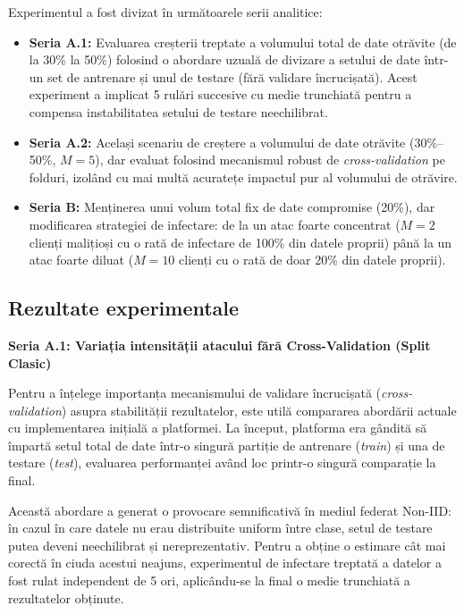 \documentclass[../../main.tex]{subfiles}
\begin{document}
        Experimentul a fost divizat în următoarele serii analitice:
        \begin{itemize}
            \item \textbf{Seria A.1:} Evaluarea creșterii treptate a volumului total de date otrăvite (de la 30\% la 50\%) folosind o abordare uzuală de divizare a setului de date într-un set de antrenare și unul de testare (fără validare încrucișată). Acest experiment a implicat 5 rulări succesive cu medie trunchiată pentru a compensa instabilitatea setului de testare neechilibrat.
            \item \textbf{Seria A.2:} Același scenariu de creștere a volumului de date otrăvite (30\%--50\%, $M=5$), dar evaluat folosind mecanismul robust de \textit{cross-validation} pe folduri, izolând cu mai multă acuratețe impactul pur al volumului de otrăvire.
            \item \textbf{Seria B:} Menținerea unui volum total fix de date compromise (20\%), dar modificarea strategiei de infectare: de la un atac foarte concentrat ($M=2$ clienți malițioși cu o rată de infectare de 100\% din datele proprii) până la un atac foarte diluat ($M=10$ clienți cu o rată de doar 20\% din datele proprii).
        \end{itemize}

        \subsection{Rezultate experimentale}
        
        \textbf{Seria A.1: Variația intensității atacului fără Cross-Validation (Split Clasic)}
        
        Pentru a înțelege importanța mecanismului de validare încrucișată (\textit{cross-validation}) asupra stabilității rezultatelor, este utilă compararea abordării actuale cu implementarea inițială a platformei. La început, platforma era gândită să împartă setul total de date într-o singură partiție de antrenare (\textit{train}) și una de testare (\textit{test}), evaluarea performanței având loc printr-o singură comparație la final.
        
        Această abordare a generat o provocare semnificativă în mediul federat Non-IID: în cazul în care datele nu erau distribuite uniform între clase, setul de testare putea deveni neechilibrat și nereprezentativ. Pentru a obține o estimare cât mai corectă în ciuda acestui neajuns, experimentul de infectare treptată a datelor a fost rulat independent de 5 ori, aplicându-se la final o medie trunchiată a rezultatelor obținute.
        
\end{document}
